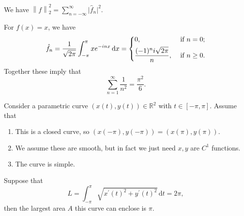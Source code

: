 \begin{eg}\label{eg:Plancherel-identity}
	We have \(\left\lVert f\right\rVert _2^2 = \sum_{n=-\infty}^\infty \vert \hat{f}_n \vert ^2\).
\end{eg}
\begin{explanation}
	For \(f(x) = x\), we have
	\[
		\hat{f}_n = \frac{1}{\sqrt{2\pi}}\int_{-\pi}^\pi x e^{-inx} \,\mathrm{d}x = \begin{dcases}
			0,                            & \text{ if } n=0 ;     \\
			\frac{(-1)^ni\sqrt{2\pi}}{n}, & \text{ if } n\geq 0 .
		\end{dcases}
	\]
	Together these imply that
	\[
		\sum_{n=1}^\infty \frac{1}{n^2} = \frac{\pi^2}{6}.
	\]
\end{explanation}
\begin{eg}
	Consider a parametric curve \((x(t),y(t)) \in \mathbb{R}^2\) with \(t \in [-\pi,\pi]\). Assume that
	\begin{enumerate}[(1)]
		\item This is a closed curve, so \((x(-\pi),y(-\pi)) = (x(\pi),y(\pi))\).
		\item We assume these are smooth, but in fact we just need \(x,y\) are \(C^1\) functions.
		\item The curve is simple.
	\end{enumerate}
	Suppose that
	\[
		L = \int_{-\pi}^\pi \sqrt{x^\prime(t)^2 + y^\prime(t)^2}  \,\mathrm{d}t = 2\pi,
	\]
	then the largest area \(A\) this curve can enclose is \(\pi \).
\end{eg}
